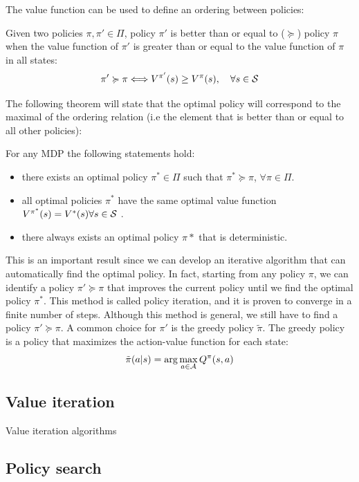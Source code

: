 The value function can be used to define an ordering between policies:
\begin{definition}
Given two policies $\pi, \pi' \in \Pi$, policy $\pi'$ is better than or equal to ($\succcurlyeq$) policy $\pi$ when the value function of $\pi'$ is greater than or equal to the value function of $\pi$ in all states:
\[
\pi' \succcurlyeq \pi \Longleftrightarrow V^{\pi'}(s) \geq V^{\pi}(s),\quad \forall s \in \mathcal{S}
\]
\end{definition}

The following theorem will state that the optimal policy will correspond to the maximal of the ordering relation (i.e the element that is better than or equal to all other policies):

\begin{theorem} 
For any MDP the following statements hold:
\begin{itemize}
\item there exists an optimal policy $\pi^* \in \Pi$ such that $\pi^* \succcurlyeq  \pi$, $\forall \pi \in \Pi$.
\item all optimal policies $\pi^*$ have the same optimal value function $V^{\pi^*}(s) = V^*(s) \forall s \in \mathcal{S}$ .
\item there always exists an optimal policy $\pi*$ that is deterministic.
\end{itemize}
\end{theorem}

This is an important result since we can develop an iterative algorithm that can automatically find the optimal policy. In fact, starting from any policy $\pi$, we can identify a policy $\pi' \succcurlyeq \pi$ that improves the current policy until we find the optimal policy $\pi^*$. This method is called policy iteration, and it is proven to converge in a finite number of steps. Although this method is general, we still have to find a policy $\pi' \succcurlyeq\pi$. A common choice for $\pi'$ is the greedy policy $\tilde{\pi}$. The greedy policy is a policy that maximizes the action-value function for each state:
\[
\tilde{\pi}(a|s) = \arg\max_{a\in\mathcal{A}} Q^{\pi}(s,a)
\]




\subsection{Value iteration}
Value iteration algorithms 

\subsection{Policy search}

